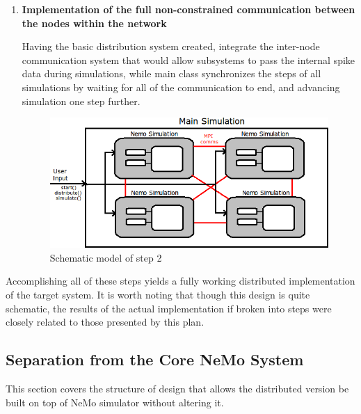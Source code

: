\begin{enumerate}
\item{\textbf{Implementation of the full non-constrained communication between the nodes within the network}}

Having the basic distribution system created, integrate the inter-node communication system that would allow subsystems to pass the internal spike data during simulations, while main class synchronizes the steps of all simulations by
waiting for all of the communication to end, and advancing simulation one step further.

\begin{figure}[h!]
\begin{center}
\includegraphics[scale = 0.7]{images/design_stage_3.png}
\end{center}
\caption{Schematic model of step 2}
\end{figure}

\end{enumerate}

Accomplishing all of these steps yields a fully working distributed implementation of the target system. It is worth noting that though this design is quite schematic, the results of the actual implementation if broken into steps were closely related to those presented by this plan.

\subsection{Separation from the Core NeMo System}

This section covers the structure of design that allows the distributed version be built on top of NeMo simulator without altering it.


